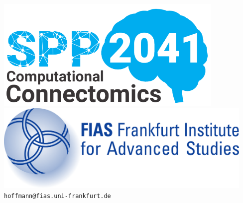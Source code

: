 \documentclass[a0,landscape]{a0poster}
\begin{document}
\begin{minipage}[b]{0.25\linewidth}
  \centering
  
  \vspace{-9cm}
  
  \includegraphics[width=11cm]{spp2041_logo.pdf}
  \hspace{2.2cm}
  \includegraphics[width=12.5cm]{FIAS-logo.pdf}\\

  \vspace{2cm}
  \Large \texttt{hoffmann@fias.uni-frankfurt.de}\\
  \vspace{3cm}
\end{minipage}
\vspace{-1.5cm} %

\end{document}
